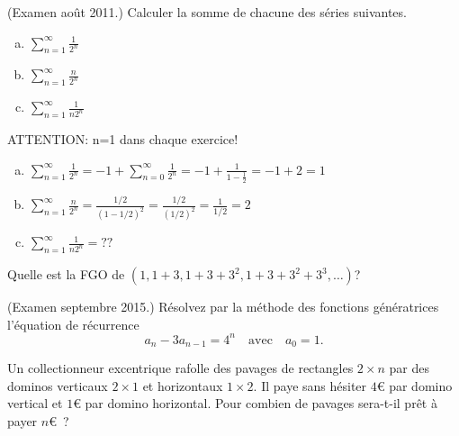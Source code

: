 \newpage


\begin{exo} (Examen ao\^ut 2011.) 
Calculer la somme de chacune des s\'eries suivantes.
%
\begin{enumerate}[a)]
\item $\displaystyle \sum_{n=1}^\infty \frac{1}{2^n}$
\item $\displaystyle \sum_{n=1}^\infty \frac{n}{2^n}$
\item $\displaystyle \sum_{n=1}^\infty \frac{1}{n 2^n}$ 
\end{enumerate}
\end{exo}

ATTENTION: n=1 dans chaque exercice!

\begin{enumerate}[a)]
\item $\displaystyle \sum_{n=1}^\infty \frac{1}{2^n} = -1 + \sum_{n=0}^\infty \frac{1}{2^n}= -1 + \frac{1}{1-\frac{1}{2}} = -1 + 2 = 1 $
\item $\displaystyle \sum_{n=1}^\infty \frac{n}{2^n} = \frac{1/2}{ (1-1/2)^2 } = \frac{1/2}{(1/2)^2} = \frac{1}{1/2} = 2$
\item $\displaystyle \sum_{n=1}^\infty \frac{1}{n 2^n} = ??$ 
\end{enumerate}


\begin{exo}
Quelle est la FGO de $(1,1+3,1+3+3^2,1+3+3^2+3^3,\ldots)$?
\end{exo}


\begin{exo} (Examen septembre 2015.)
R\'esolvez par la m\'ethode des fonctions g\'en\'eratrices l'\'equation de r\'ecurrence 
\[
a_n-3a_{n-1}=4^n \quad \mathrm{avec} \quad a_0=1.
\]
\end{exo}


\begin{exo}
Un collectionneur excentrique rafolle des pavages de rectangles $2 \times n$ par des dominos verticaux $2 \times 1$ et horizontaux $1 \times 2$. Il paye sans h\'esiter $4$\euro{} par domino vertical et $1$\euro{} par domino horizontal. Pour combien de pavages sera-t-il pr\^et \`a payer $n$\euro~?
\end{exo}


